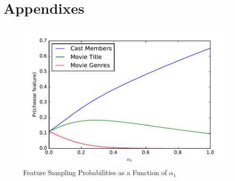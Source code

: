 \documentclass{article} %
\begin{document}


{


}

\pagebreak
\appendix
\renewcommand\thefigure{A.\arabic{figure}}
\setcounter{figure}{0}
\section{Appendixes}
\begin{figure}[h]
\centering
\includegraphics[scale=.6]{../paper/output/samplingprobs.pdf}
\caption{Feature Sampling Probabilities as a Function of $\alpha_1$}
\label{fig:alpha}
\end{figure}
\end{document}

